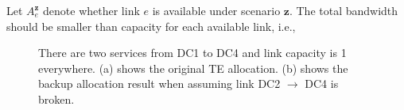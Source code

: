 \documentclass[sigconf]{acmart}
\begin{document}
Let $A_e^{ \bm{z}}$ denote whether link $e$ is available under scenario $ \bm{z}$.
The total bandwidth should be smaller than capacity for each available link, i.e.,  

\begin{figure}[t]
\centering
{}
\caption{There are two services from DC1 to DC4 and link capacity is 1 everywhere. (a) shows the original TE allocation. (b) shows the backup allocation result when assuming link DC2 $\to$ DC4 is broken.  }
\label{recovery}
\end{figure}
\end{document}
